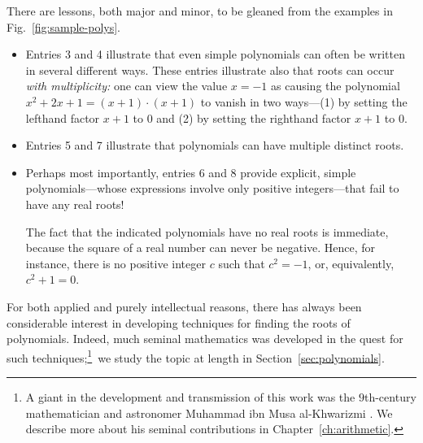 \medskip

\noindent
There are lessons, both major and minor, to be gleaned from the examples in Fig.~\ref{fig:sample-polys}.

\begin{itemize}
\item
Entries 3 and 4 illustrate that even simple polynomials can often be
written in several different ways.  These entries illustrate also that
roots can occur {\em with multiplicity:}
 one can view the value $x = -1$
as causing the polynomial $x^2 + 2x +1 = (x+1)\cdot (x+1)$ to vanish
in two ways---(1) by setting the lefthand factor $x+1$ to $0$ and (2)
by setting the righthand factor $x+1$ to $0$.

\item
Entries 5 and 7 illustrate that polynomials can have multiple distinct
roots.

\item
Perhaps most importantly, entries 6 and 8 provide explicit, simple
polynomials---whose expressions involve only positive integers---that
fail to have any real roots!

The fact that the indicated polynomials have no real roots is
immediate, because the square of a real number can never be negative.
Hence, for instance, there is no positive integer $c$ such that $c^2 =
-1$, or, equivalently, $c^2 + 1 = 0$.
\end{itemize}

\smallskip

For both applied and purely intellectual reasons, there has always
been considerable interest in developing techniques for finding the
roots of polynomials.  Indeed, much seminal mathematics was developed
in the quest for such techniques;\footnote{A giant in the development
  and transmission of this work was the $9$th-century mathematician
  and astronomer Muhammad ibn Musa al-Khwarizmi .  We describe more about his seminal contributions in
  Chapter~\ref{ch:arithmetic}.}~we study the topic at length in
Section~\ref{sec:polynomials}.

